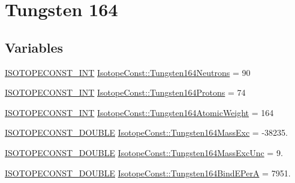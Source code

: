 \hypertarget{group___isotope_const-_tungsten-_w164}{}\section{Tungsten 164}
\label{group___isotope_const-_tungsten-_w164}
\subsection*{Variables}
\begin{DoxyCompactItemize}
\item 
\mbox{\hyperlink{group___isotope_const-_macros_ga5f18360b3e99483a35c32d789e62621c}{I\+S\+O\+T\+O\+P\+E\+C\+O\+N\+S\+T\+\_\+\+I\+NT}} \mbox{\hyperlink{group___isotope_const-_tungsten-_w164_ga728a34d24f301d753ff631a53c39ee1b}{Isotope\+Const\+::\+Tungsten164\+Neutrons}} = 90
\item 
\mbox{\hyperlink{group___isotope_const-_macros_ga5f18360b3e99483a35c32d789e62621c}{I\+S\+O\+T\+O\+P\+E\+C\+O\+N\+S\+T\+\_\+\+I\+NT}} \mbox{\hyperlink{group___isotope_const-_tungsten-_w164_ga4042b74bd7a008c6cb7e9d9456008841}{Isotope\+Const\+::\+Tungsten164\+Protons}} = 74
\item 
\mbox{\hyperlink{group___isotope_const-_macros_ga5f18360b3e99483a35c32d789e62621c}{I\+S\+O\+T\+O\+P\+E\+C\+O\+N\+S\+T\+\_\+\+I\+NT}} \mbox{\hyperlink{group___isotope_const-_tungsten-_w164_ga326366152b40bc3bae52b2a3ef8b17d1}{Isotope\+Const\+::\+Tungsten164\+Atomic\+Weight}} = 164
\item 
\mbox{\hyperlink{group___isotope_const-_macros_ga8f45a7272ce02c0b4c65c44636ed719a}{I\+S\+O\+T\+O\+P\+E\+C\+O\+N\+S\+T\+\_\+\+D\+O\+U\+B\+LE}} \mbox{\hyperlink{group___isotope_const-_tungsten-_w164_gab5c4eca2c302cbe18e5236b76057d2c5}{Isotope\+Const\+::\+Tungsten164\+Mass\+Exc}} = -\/38235.
\item 
\mbox{\hyperlink{group___isotope_const-_macros_ga8f45a7272ce02c0b4c65c44636ed719a}{I\+S\+O\+T\+O\+P\+E\+C\+O\+N\+S\+T\+\_\+\+D\+O\+U\+B\+LE}} \mbox{\hyperlink{group___isotope_const-_tungsten-_w164_ga4691b64c5c957647ebfe34031fe8e542}{Isotope\+Const\+::\+Tungsten164\+Mass\+Exc\+Unc}} = 9.
\item 
\mbox{\hyperlink{group___isotope_const-_macros_ga8f45a7272ce02c0b4c65c44636ed719a}{I\+S\+O\+T\+O\+P\+E\+C\+O\+N\+S\+T\+\_\+\+D\+O\+U\+B\+LE}} \mbox{\hyperlink{group___isotope_const-_tungsten-_w164_gabfed9f3d0a72c04c98b14870a92c0a7e}{Isotope\+Const\+::\+Tungsten164\+Bind\+E\+PerA}} = 7951.
\item 

\end{DoxyCompactItemize}

